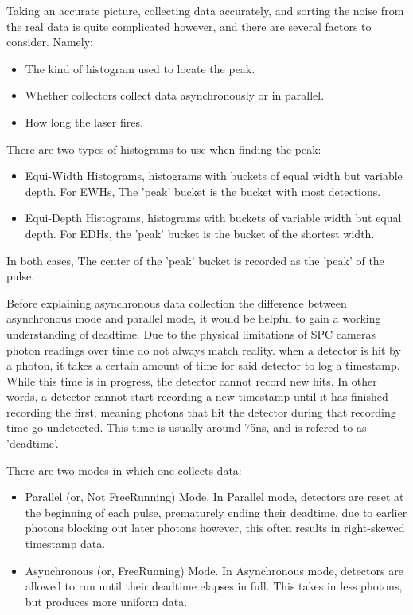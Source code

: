 \documentclass{article}
\begin{document}
Taking an accurate picture, collecting data accurately, and sorting the noise from the real data is quite complicated however, and there are several factors to consider. Namely:
\begin{itemize}
\item The kind of histogram used to locate the peak.
\item Whether collectors collect data asynchronously or in parallel.
\item How long the laser fires.
\end{itemize}

There are two types of histograms to use when finding the peak: \cite{sadekar}
\begin{itemize}
\item Equi-Width Histograms, histograms with buckets of equal width but variable depth. For EWHs, The 'peak' bucket is the bucket with most detections.
\item Equi-Depth Histograms, histograms with buckets of variable width but equal depth. For EDHs, the 'peak' bucket is the bucket of the shortest width.
\end{itemize}
In both cases, The center of the 'peak' bucket is recorded as the 'peak' of the pulse.

Before explaining asynchronous data collection the difference between asynchronous mode and parallel mode, it would be helpful to gain a working understanding of deadtime.
Due to the physical limitations of SPC cameras photon readings over time do not always match reality. when a detector is hit by a photon, it takes a certain amount of time for said detector to log a timestamp. While this time is in progress, the detector cannot record new hits. In other words, a detector cannot start recording a new timestamp until it has finished recording the first, meaning photons that hit the detector during that recording time go undetected. This time is usually around 75ns, and is refered to as 'deadtime'. \cite{sadekar}

There are two modes in which one collects data: \cite{sadekar}
\begin{itemize}
\item Parallel (or, Not FreeRunning) Mode. In Parallel mode, detectors are reset at the beginning of each pulse, prematurely ending their deadtime. due to earlier photons blocking out later photons however, this often results in right-skewed timestamp data.
\item Asynchronous (or, FreeRunning) Mode. In Asynchronous mode, detectors are allowed to run until their deadtime elapses in full. This takes in less photons, but produces more uniform data.
\end{itemize}
\end{document}
